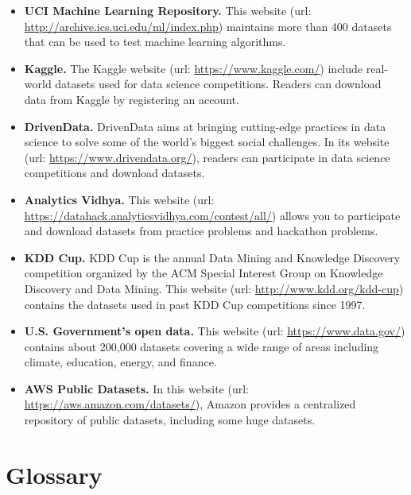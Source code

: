 \documentclass[
]{book}
\providecommand{\tightlist}{%
  \setlength{\itemsep}{0pt}\setlength{\parskip}{0pt}}
\begin{document}
\begin{itemize}
\tightlist
\item
  \textbf{UCI Machine Learning Repository.} This website (url: \url{http://archive.ics.uci.edu/ml/index.php}) maintains more than 400 datasets that can be used to test machine learning algorithms.
\item
  \textbf{Kaggle.} The Kaggle website (url: \url{https://www.kaggle.com/}) include real-world datasets used for data science competitions. Readers can download data from Kaggle by registering an account.
\item
  \textbf{DrivenData.} DrivenData aims at bringing cutting-edge practices in data science to solve some of the world's biggest social challenges. In its website (url: \url{https://www.drivendata.org/}), readers can participate in data science competitions and download datasets.
\item
  \textbf{Analytics Vidhya.} This website (url: \url{https://datahack.analyticsvidhya.com/contest/all/}) allows you to participate and download datasets from practice problems and hackathon problems.
\item
  \textbf{KDD Cup.} KDD Cup is the annual Data Mining and Knowledge Discovery competition organized by the ACM Special Interest Group on Knowledge Discovery and Data Mining. This website (url: \url{http://www.kdd.org/kdd-cup}) contains the datasets used in past KDD Cup competitions since 1997.
\item
  \textbf{U.S. Government's open data.} This website (url: \url{https://www.data.gov/}) contains about 200,000 datasets covering a wide range of areas including climate, education, energy, and finance.
\item
  \textbf{AWS Public Datasets.} In this website (url: \url{https://aws.amazon.com/datasets/}), Amazon provides a centralized repository of public datasets, including some huge datasets.
\end{itemize}

\hypertarget{ChapGlossary}{%
\chapter{Glossary}\label{ChapGlossary}}
\end{document}
